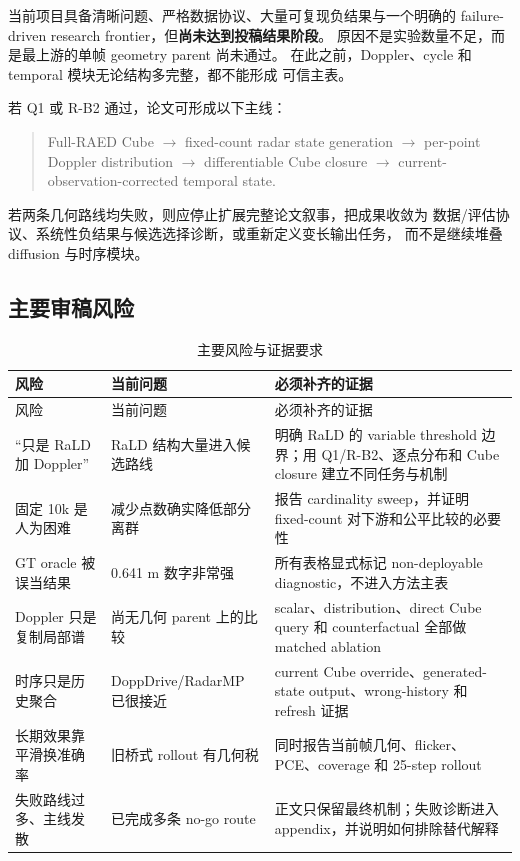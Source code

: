 \documentclass[11pt,a4paper,fontset=none]{ctexart}
\begin{document}
当前项目具备清晰问题、严格数据协议、大量可复现负结果与一个明确的
failure-driven research frontier，但\textbf{尚未达到投稿结果阶段}。
原因不是实验数量不足，而是最上游的单帧 geometry parent 尚未通过。
在此之前，Doppler、cycle 和 temporal 模块无论结构多完整，都不能形成
可信主表。

若 Q1 或 R-B2 通过，论文可形成以下主线：
\begin{quote}
Full-RAED Cube $\rightarrow$ fixed-count radar state generation
$\rightarrow$ per-point Doppler distribution
$\rightarrow$ differentiable Cube closure
$\rightarrow$ current-observation-corrected temporal state.
\end{quote}
若两条几何路线均失败，则应停止扩展完整论文叙事，把成果收敛为
数据/评估协议、系统性负结果与候选选择诊断，或重新定义变长输出任务，
而不是继续堆叠 diffusion 与时序模块。

\subsection{主要审稿风险}

\begin{longtable}{p{3.5cm} p{5.1cm} p{5.8cm}}
\caption{主要风险与证据要求}\\
\toprule
风险 & 当前问题 & 必须补齐的证据 \\
\midrule
\endfirsthead
\toprule
风险 & 当前问题 & 必须补齐的证据 \\
\midrule
\endhead
“只是 RaLD 加 Doppler” &
RaLD 结构大量进入候选路线 &
明确 RaLD 的 variable threshold 边界；用 Q1/R-B2、逐点分布和 Cube closure
建立不同任务与机制 \\

固定 10k 是人为困难 &
减少点数确实降低部分离群 &
报告 cardinality sweep，并证明 fixed-count 对下游和公平比较的必要性 \\

GT oracle 被误当结果 &
0.641 m 数字非常强 &
所有表格显式标记 non-deployable diagnostic，不进入方法主表 \\

Doppler 只是复制局部谱 &
尚无几何 parent 上的比较 &
scalar、distribution、direct Cube query 和 counterfactual 全部做 matched ablation \\

时序只是历史聚合 &
DoppDrive/RadarMP 已很接近 &
current Cube override、generated-state output、wrong-history 和 refresh 证据 \\

长期效果靠平滑换准确率 &
旧桥式 rollout 有几何税 &
同时报告当前帧几何、flicker、PCE、coverage 和 25-step rollout \\

失败路线过多、主线发散 &
已完成多条 no-go route &
正文只保留最终机制；失败诊断进入 appendix，并说明如何排除替代解释 \\
\bottomrule
\end{longtable}
\end{document}
